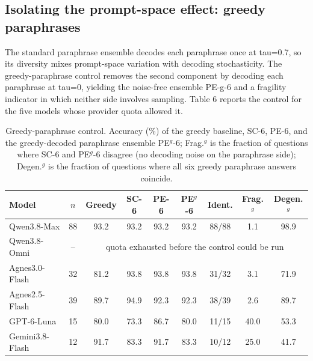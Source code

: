 \documentclass[preprint,12pt]{elsarticle}
\begin{document}
\subsection{Isolating the prompt-space effect: greedy paraphrases}


The standard paraphrase ensemble decodes each paraphrase once at tau=0.7, so its diversity mixes prompt-space variation with decoding stochasticity. The greedy-paraphrase control removes the second component by decoding each paraphrase at tau=0, yielding the noise-free ensemble PE-g-6 and a fragility indicator in which neither side involves sampling. Table 6 reports the control for the five models whose provider quota allowed it.

\begin{table}[htbp]
\centering
\footnotesize
\caption{Greedy-paraphrase control. Accuracy (\%) of the greedy baseline, SC-6, PE-6, and the greedy-decoded paraphrase ensemble PE$^{g}$-6; Frag.$^{g}$ is the fraction of questions where SC-6 and PE$^{g}$-6 disagree (no decoding noise on the paraphrase side); Degen.$^{g}$ is the fraction of questions where all six greedy paraphrase answers coincide.}

\footnotesize
\begin{tabular}{l c c c c c c c c}
\toprule
Model & $n$ & Greedy & SC-6 & PE-6 & PE$^{g}$-6 & Ident. & Frag.$^{g}$ & Degen.$^{g}$ \\
\midrule
Qwen3.8-Max & 88 & 93.2 & 93.2 & 93.2 & 93.2 & 88/88 & 1.1 & 98.9 \\
Qwen3.8-Omni & -- & \multicolumn{7}{c}{quota exhausted before the control could be run} \\
Agnes3.0-Flash & 32 & 81.2 & 93.8 & 93.8 & 93.8 & 31/32 & 3.1 & 71.9 \\
Agnes2.5-Flash & 39 & 89.7 & 94.9 & 92.3 & 92.3 & 38/39 & 2.6 & 89.7 \\
GPT-6-Luna & 15 & 80.0 & 73.3 & 86.7 & 80.0 & 11/15 & 40.0 & 53.3 \\
Gemini3.8-Flash & 12 & 91.7 & 83.3 & 91.7 & 83.3 & 10/12 & 25.0 & 41.7 \\
\bottomrule
\end{tabular}
\end{table}
\end{document}
